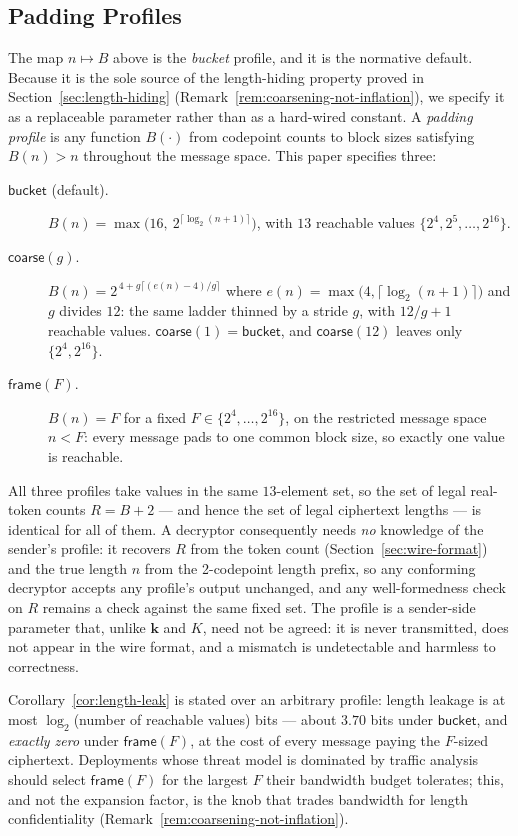 \documentclass[11pt,a4paper]{article}
\begin{document}
\subsection{Padding Profiles}
\label{sec:pad-profiles}

The map $n\mapsto B$ above is the \emph{bucket} profile, and it is the
normative default. Because it is the sole source of the length-hiding
property proved in Section~\ref{sec:length-hiding}
(Remark~\ref{rem:coarsening-not-inflation}), we specify it as a replaceable
parameter rather than as a hard-wired constant. A \emph{padding profile} is
any function $B(\cdot)$ from codepoint counts to block sizes satisfying
$B(n)>n$ throughout the message space. This paper specifies three:
\begin{description}
  \item[$\mathsf{bucket}$ (default).]
        $B(n)=\max\bigl(16,\ 2^{\lceil\log_2(n+1)\rceil}\bigr)$, with $13$
        reachable values $\{2^4,2^5,\ldots,2^{16}\}$.
  \item[$\mathsf{coarse}(g)$.] $B(n)=2^{\,4+g\lceil(e(n)-4)/g\rceil}$ where
        $e(n)=\max\bigl(4,\lceil\log_2(n+1)\rceil\bigr)$ and $g$ divides
        $12$: the same ladder thinned by a stride $g$, with $12/g+1$
        reachable values. $\mathsf{coarse}(1)=\mathsf{bucket}$, and
        $\mathsf{coarse}(12)$ leaves only $\{2^4,2^{16}\}$.
  \item[$\mathsf{frame}(F)$.] $B(n)=F$ for a fixed
        $F\in\{2^4,\ldots,2^{16}\}$, on the restricted message space $n<F$:
        every message pads to one common block size, so exactly one value is
        reachable.
\end{description}

All three profiles take values in the same $13$-element set, so the set of
legal real-token counts $R=B+2$ — and hence the set of legal ciphertext
lengths — is identical for all of them. A decryptor consequently needs
\emph{no} knowledge of the sender's profile: it recovers $R$ from the token
count (Section~\ref{sec:wire-format}) and the true length $n$ from the
2-codepoint length prefix, so any conforming decryptor accepts any
profile's output unchanged, and any well-formedness check on $R$ remains a
check against the same fixed set. The profile is a sender-side parameter
that, unlike $\mathbf{k}$ and $K$, need not be agreed: it is never
transmitted, does not appear in the wire format, and a mismatch is
undetectable and harmless to correctness.

Corollary~\ref{cor:length-leak} is stated over an arbitrary profile: length
leakage is at most $\log_2$(number of reachable values) bits — about $3.70$
bits under $\mathsf{bucket}$, and \emph{exactly zero} under
$\mathsf{frame}(F)$, at the cost of every message paying the $F$-sized
ciphertext. Deployments whose threat model is dominated by traffic analysis
should select $\mathsf{frame}(F)$ for the largest $F$ their bandwidth budget
tolerates; this, and not the expansion factor, is the knob that trades
bandwidth for length confidentiality
(Remark~\ref{rem:coarsening-not-inflation}).
\end{document}
